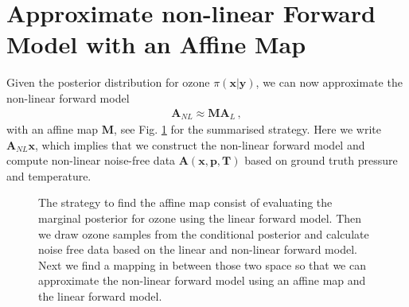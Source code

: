 \section{Approximate non-linear Forward Model with an Affine Map} 
\label{sec:affineMap}
Given the posterior distribution for ozone $ \pi(\bm{x}|\bm{y})$, we can now approximate the non-linear forward model 
\begin{align}
	\bm{A}_{NL} \approx \bm{M A}_L \, ,
\end{align}
with an affine map $\bm{M}$, see Fig. \ref{fig:affinStrat} for the summarised strategy.
Here we write $\bm{A}_{NL} \bm{x}$, which implies that we construct the non-linear forward model and compute non-linear noise-free data $\bm{A}(\bm{x},\bm{p},\bm{T})$ based on ground truth pressure and temperature.
\begin{figure}[htb!]
	\centering
	\caption[Strategy to find affine map.]{The strategy to find the affine map consist of evaluating the marginal posterior for ozone using the linear forward model. Then we draw ozone samples from the conditional posterior and calculate noise free data based on the linear and non-linear forward model. Next we find a mapping in between those two space so that we can approximate the non-linear forward model using an affine map and the linear forward model.}
	\label{fig:affinStrat}
\end{figure}
